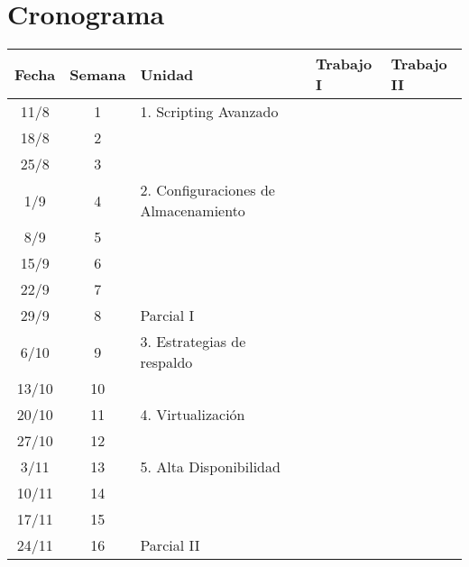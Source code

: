 \section {Cronograma}
\begin{tabular}{c|c|l|l|l}
Fecha & Semana & Unidad & Trabajo I & Trabajo II\\
\hline
\hline
11/8 & 1	& 	1. Scripting Avanzado 					& 	& \\
18/8 & 2 	& 								 	& 	& \\
25/8 & 3	& 											&	& \\
\hline
\hline
1/9 & 4 	& 	2. Configuraciones de Almacenamiento	&	& \\
8/9 & 5		& 	 	& 	& \\
15/9 & 6	& 									&	& \\
22/9 & 7 	& 									&   & \\
29/9 & 8	& 			Parcial I						&  	& \\ 
\hline
\hline
6/10& 9		& 	3. Estrategias de respaldo						& 	& \\
13/10 & 10	& 		& 	& \\ 
\hline
\hline
20/10 & 11	& 	4. Virtualización								& 	& \\
27/10 & 12	& 									&	& \\
\hline
\hline
3/11 & 13	& 	5. Alta Disponibilidad								&	& \\
10/11 & 14	& 	 	&	& \\
17/11 & 15	& 									&	& \\
24/11 & 16	& 	Parcial II						&	& \\ 
\hline
\end{tabular}


